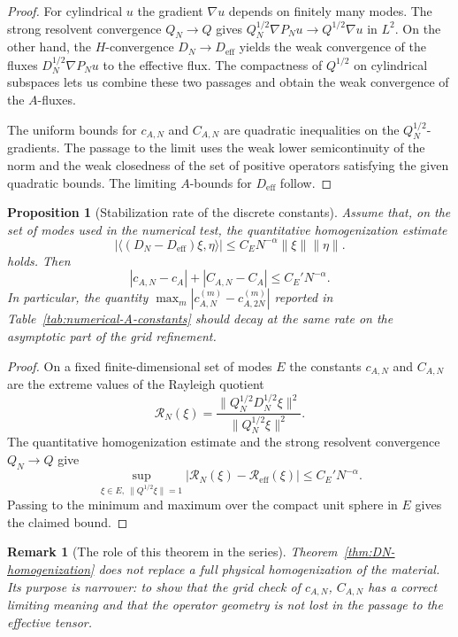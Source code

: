 \documentclass{article}
\newtheorem{proposition}[theorem]{Proposition}
\newtheorem{remark}[theorem]{Remark}
\begin{document}
\begin{proof}
For cylindrical \(u\) the gradient \(\nabla u\) depends on finitely many modes.
The strong resolvent convergence \(Q_N\to Q\) gives
\(Q_N^{1/2}\nabla P_Nu\to Q^{1/2}\nabla u\) in \(L^2\). On the other hand, the
\(H\)-convergence \(D_N\to D_{\mathrm{eff}}\) yields the weak convergence of the
fluxes \(D_N^{1/2}\nabla P_Nu\) to the effective flux. The compactness of
\(Q^{1/2}\) on cylindrical subspaces lets us combine these two passages and obtain
the weak convergence of the \(A\)-fluxes.

The uniform bounds for \(c_{A,N}\) and \(C_{A,N}\) are quadratic inequalities on
the \(Q_N^{1/2}\)-gradients. The passage to the limit uses the weak lower
semicontinuity of the norm and the weak closedness of the set of positive
operators satisfying the given quadratic bounds. The limiting \(A\)-bounds for
\(D_{\mathrm{eff}}\) follow.
\end{proof}


\begin{proposition}[Stabilization rate of the discrete constants]
\label{prop:discrete-constants-rate}
Assume that, on the set of modes used in the numerical test, the quantitative
homogenization estimate
\[
        \left|
        \langle (D_N-D_{\mathrm{eff}})\xi,\eta\rangle
        \right|
        \le C_E N^{-\alpha}\|\xi\|\|\eta\| .
\]
holds. Then
\[
        |c_{A,N}-c_A|+|C_{A,N}-C_A|
        \le C_E' N^{-\alpha}.
\]
In particular, the quantity \(\max_m|c_{A,N}^{(m)}-c_{A,2N}^{(m)}|\) reported in
Table~\ref{tab:numerical-A-constants} should decay at the same rate on the
asymptotic part of the grid refinement.
\end{proposition}

\begin{proof}
On a fixed finite-dimensional set of modes \(E\) the constants \(c_{A,N}\) and
\(C_{A,N}\) are the extreme values of the Rayleigh quotient
\[
        \mathcal R_N(\xi)=
        \frac{\|Q_N^{1/2}D_N^{1/2}\xi\|^2}{\|Q_N^{1/2}\xi\|^2} .
\]
The quantitative homogenization estimate and the strong resolvent convergence
\(Q_N\to Q\) give
\[
        \sup_{\xi\in E,\ \|Q^{1/2}\xi\|=1}
        |\mathcal R_N(\xi)-\mathcal R_{\mathrm{eff}}(\xi)|
        \le C_E'N^{-\alpha}.
\]
Passing to the minimum and maximum over the compact unit sphere in \(E\) gives the
claimed bound.
\end{proof}

\begin{remark}[The role of this theorem in the series]
Theorem~\ref{thm:DN-homogenization} does not replace a full physical
homogenization of the material. Its purpose is narrower: to show that the grid
check of \(c_{A,N}\), \(C_{A,N}\) has a correct limiting meaning and that the
operator geometry is not lost in the passage to the effective tensor.
\end{remark}
\end{document}
